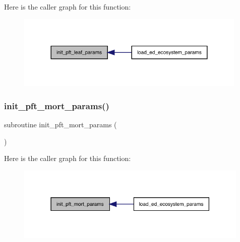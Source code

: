 Here is the caller graph for this function\+:
\nopagebreak
\begin{figure}[H]
\begin{center}
\leavevmode
\includegraphics[width=312pt]{ed__params_8f90_a29b230a8d89c33fcad9397cb52370594_icgraph}
\end{center}
\end{figure}
\mbox{\label{ed__params_8f90_a719e10b9e06dbf410f4a06eae937a544}} 
\subsubsection{\texorpdfstring{init\+\_\+pft\+\_\+mort\+\_\+params()}{init\_pft\_mort\_params()}}
{\footnotesize\ttfamily subroutine init\+\_\+pft\+\_\+mort\+\_\+params (\begin{DoxyParamCaption}{ }\end{DoxyParamCaption})}

Here is the caller graph for this function\+:
\nopagebreak
\begin{figure}[H]
\begin{center}
\leavevmode
\includegraphics[width=315pt]{ed__params_8f90_a719e10b9e06dbf410f4a06eae937a544_icgraph}
\end{center}
\end{figure}
\mbox{\label{ed__params_8f90_a1e97106c420d4474c8e99ca03cab1dca}} 
